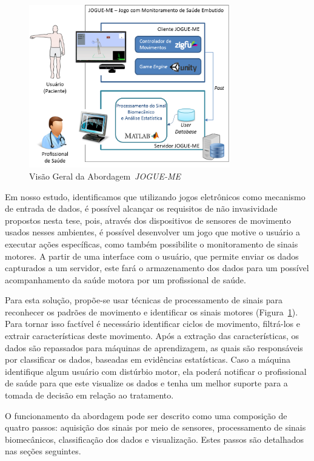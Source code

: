 \begin{figure}[!h]
     \centering
     \includegraphics[width=0.78\textwidth]{./img/visaosistema.png}
     \caption{Visão Geral da Abordagem~\textit{JOGUE-ME}}
     \label{img:visaogeral}
\end{figure}

Em nosso estudo, identificamos que utilizando jogos eletrônicos como mecanismo de entrada de dados, é possível alcançar os requisitos de não invasividade propostos nesta tese, pois, através dos dispositivos de sensores de movimento usados nesses ambientes, é possível desenvolver um jogo que motive o usuário a executar ações específicas, como também possibilite o monitoramento de sinais motores. A partir de uma interface com o usuário, que permite enviar os dados capturados a um servidor, este fará o armazenamento dos dados para um possível acompanhamento da saúde motora por um profissional de saúde.

Para esta solução, propõe-se usar técnicas de processamento de sinais para reconhecer os padrões de movimento e identificar os sinais motores (Figura~\ref{img:visaogeral}). Para tornar isso factível é necessário identificar ciclos de movimento, filtrá-los e extrair características deste movimento. Após a extração das características, os dados são repassados para máquinas de aprendizagem, as quais são responsáveis por classificar os dados, baseadas em evidências estatísticas. Caso a máquina identifique algum usuário com distúrbio motor, ela poderá notificar o profissional de saúde para que este visualize os dados e tenha um melhor suporte para a tomada de decisão em relação ao tratamento.

O funcionamento da abordagem pode ser descrito como uma composição de quatro passos: aquisição dos sinais por meio de sensores, processamento de sinais biomecânicos, classificação dos dados e visualização. Estes passos são detalhados nas seções seguintes.

